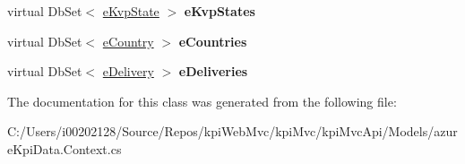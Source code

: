 \begin{DoxyCompactItemize}
virtual Db\+Set$<$ \hyperlink{classkpi_mvc_api_1_1_models_1_1e_kvp_state}{e\+Kvp\+State} $>$ {\bfseries e\+Kvp\+States}
\item 
\mbox{\label{classkpi_mvc_api_1_1_models_1_1kpidb_entities1_a5d1559038f6fa77cc98b90d0bfac26b3}} 
virtual Db\+Set$<$ \hyperlink{classkpi_mvc_api_1_1_models_1_1e_country}{e\+Country} $>$ {\bfseries e\+Countries}
\item 
\mbox{\label{classkpi_mvc_api_1_1_models_1_1kpidb_entities1_a379680b3bc4e3d3ce1b35b7b3ae97daa}} 
virtual Db\+Set$<$ \hyperlink{classkpi_mvc_api_1_1_models_1_1e_delivery}{e\+Delivery} $>$ {\bfseries e\+Deliveries}
\end{DoxyCompactItemize}


The documentation for this class was generated from the following file\+:\begin{DoxyCompactItemize}
\item 
C\+:/\+Users/i00202128/\+Source/\+Repos/kpi\+Web\+Mvc/kpi\+Mvc/kpi\+Mvc\+Api/\+Models/azure\+Kpi\+Data.\+Context.\+cs\end{DoxyCompactItemize}
